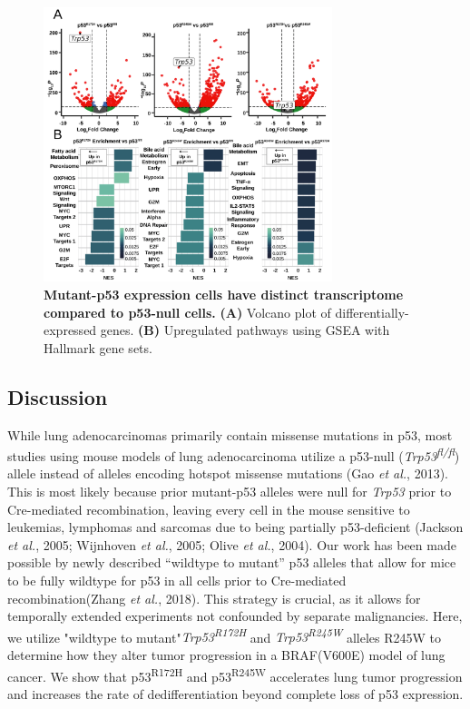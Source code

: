 \begin{figure}
\hypertarget{fig:14}{%
\centering
\includegraphics[width=0.75\textwidth,height=\textheight]{images/figure4_021722.svg}
\caption{\textbf{Mutant-p53 expression cells have distinct transcriptome compared to p53-null cells.} \textbf{(A)} Volcano plot of differentially-expressed genes. \textbf{(B)} Upregulated pathways using GSEA with Hallmark gene sets.}\label{fig:14}
}
\end{figure}

\hypertarget{discussion-1}{%
\subsection{Discussion}\label{discussion-1}}

While lung adenocarcinomas primarily contain missense mutations in p53, most studies using mouse models of lung adenocarcinoma utilize a p53-null (\emph{Trp53\textsuperscript{fl/fl}}) allele instead of alleles encoding hotspot missense mutations (Gao \emph{et al.}, 2013). This is most likely because prior mutant-p53 alleles were null for \emph{Trp53} prior to Cre-mediated recombination, leaving every cell in the mouse sensitive to leukemias, lymphomas and sarcomas due to being partially p53-deficient (Jackson \emph{et al.}, 2005; Wijnhoven \emph{et al.}, 2005; Olive \emph{et al.}, 2004). Our work has been made possible by newly described ``wildtype to mutant'' p53 alleles that allow for mice to be fully wildtype for p53 in all cells prior to Cre-mediated recombination(Zhang \emph{et al.}, 2018). This strategy is crucial, as it allows for temporally extended experiments not confounded by separate malignancies. Here, we utilize "wildtype to mutant"\emph{Trp53\textsuperscript{R172H}} and \emph{Trp53\textsuperscript{R245W}} alleles R245W to determine how they alter tumor progression in a BRAF(V600E) model of lung cancer. We show that p53\textsuperscript{R172H} and p53\textsuperscript{R245W} accelerates lung tumor progression and increases the rate of dedifferentiation beyond complete loss of p53 expression.

